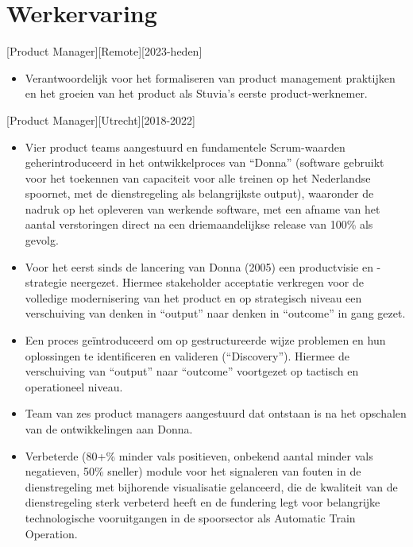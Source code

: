 \documentclass[10pt]{article}
\begin{document}
\makecvtitle

\section{Werkervaring}
\label{sec:work}

[Product Manager][Remote][2023-heden]
\begin{itemize}
    \item Verantwoordelijk voor het formaliseren van product management praktijken en het groeien van het product als Stuvia's eerste product-werknemer.
\end{itemize}

[Product Manager][Utrecht][2018-2022]
\begin{itemize}
    \item Vier product teams aangestuurd en fundamentele Scrum-waarden geherintroduceerd in het ontwikkelproces van \enquote{Donna} (software gebruikt voor het toekennen van capaciteit voor alle treinen op het Nederlandse spoornet, met de dienstregeling als belangrijkste output), waaronder de nadruk op het opleveren van werkende software, met een afname van het aantal verstoringen direct na een driemaandelijkse release van 100\% als gevolg.
    \item Voor het eerst sinds de lancering van Donna (2005) een productvisie en -strategie neergezet. Hiermee stakeholder acceptatie verkregen voor de volledige modernisering van het product en op strategisch niveau een verschuiving van denken in “output” naar denken in “outcome” in gang gezet.
    \item Een proces geïntroduceerd om op gestructureerde wijze problemen en hun oplossingen te identificeren en valideren (\enquote{Discovery}). Hiermee de verschuiving van “output” naar “outcome” voortgezet op tactisch en operationeel niveau.
    \item Team van zes product managers aangestuurd dat ontstaan is na het opschalen van de ontwikkelingen aan Donna.
    \item Verbeterde (80+\% minder vals positieven, onbekend aantal minder vals negatieven, 50\% sneller) module voor het signaleren van fouten in de dienstregeling met bijhorende visualisatie gelanceerd, die de kwaliteit van de dienstregeling sterk verbeterd heeft en de fundering legt voor belangrijke technologische vooruitgangen in de spoorsector als Automatic Train Operation.
\end{itemize}
\end{document}
